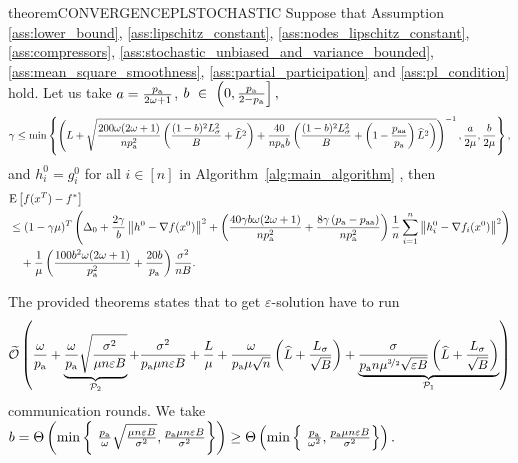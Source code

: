 \documentclass{article}
\newcommand{\algorithmname}{DASHA-PP}
\newcommand*{\probavailable}{\ensuremath{p_{\textnormal{a}}}}
\newcommand*{\probpairaa}{\ensuremath{p_{\textnormal{aa}}}}
\begin{document}
\begin{restatable}{theorem}{CONVERGENCEPLSTOCHASTIC}
  \label{theorem:stochastic_pl}
  Suppose that Assumption \ref{ass:lower_bound}, \ref{ass:lipschitz_constant}, \ref{ass:nodes_lipschitz_constant}, \ref{ass:compressors}, \ref{ass:stochastic_unbiased_and_variance_bounded}, \ref{ass:mean_square_smoothness}, \ref{ass:partial_participation} and \ref{ass:pl_condition} hold. Let us take $a = \frac{\probavailable}{2\omega + 1}$, $b~\in~\left(0, \frac{\probavailable}{2 - \probavailable}\right],$
  $$\gamma \leq \min\left\{\left(L + \sqrt{\frac{200 \omega (2 \omega + 1)}{n \probavailable^2} \left(\frac{(1 - b)^2 L_{\sigma}^2}{B} + \widehat{L}^2\right) + \frac{40}{n \probavailable b}\left(\frac{(1 - b)^2 L_{\sigma}^2}{B} + \left(1 - \frac{\probpairaa}{\probavailable}\right) \widehat{L}^2 \right)}\right)^{-1}, \frac{a}{2\mu} , \frac{b}{2\mu}\right\},$$
  and $h^{0}_i = g^{0}_i$ for all $i \in [n]$ in Algorithm~\ref{alg:main_algorithm} \algname{(\algorithmname-MVR)},
  then 
  \begin{align*}
      &\Exp{f(x^{T}) - f^*} \\
      &\leq (1 - \gamma \mu)^{T}\left(\Delta_0 + \frac{2 \gamma}{b} \norm{h^{0} - \nabla f(x^{0})}^2 + \left(\frac{40 \gamma b \omega (2 \omega + 1)}{n \probavailable^2} + \frac{8 \gamma \left(\probavailable - \probpairaa\right)}{n \probavailable^2}\right)\frac{1}{n}\sum_{i=1}^n\norm{h^{0}_i - \nabla f_i(x^{0})}^2\right) \\
      &\quad + \frac{1}{\mu}\left(\frac{100 b^2 \omega (2 \omega + 1)}{\probavailable^2} + \frac{20 b}{\probavailable}\right) \frac{\sigma^2}{n B}.
  \end{align*}
\end{restatable}

The provided theorems states that to get $\varepsilon$-solution \algname{\algorithmname} have to run
\begin{align}
  \label{eq:pl_compare:new:mvr}
  \widetilde{\cO}\left(\frac{\omega}{\probavailable} + \underbrace{\frac{\omega}{\probavailable}\sqrt{\frac{\sigma^2}{\mu n \varepsilon B}}}_{\mathcal{P}_2} + \frac{\sigma^2}{\probavailable \mu n \varepsilon B} + \frac{L}{\mu} + \frac{\omega}{\probavailable \mu \sqrt{n}} \left(\widehat{L} + \frac{L_{\sigma}}{\sqrt{B}}\right) + \underbrace{\frac{\sigma}{\probavailable n \mu^{\nicefrac{3}{2}} \sqrt{\varepsilon B}}\left(\widehat{L} + \frac{L_{\sigma}}{\sqrt{B}}\right)}_{\mathcal{P}_1}\right)
\end{align}
communication rounds. We take $b = \Theta\left(\min \left\{\ \frac{\probavailable}{\omega} \sqrt{\frac{\mu n \varepsilon B}{\sigma^2}}, \frac{\probavailable \mu n \varepsilon B}{\sigma^2}\right\}\right) \geq \Theta\left(\min \left\{\ \frac{\probavailable}{\omega^2}, \frac{\probavailable \mu n \varepsilon B}{\sigma^2}\right\}\right).$
\end{document}
